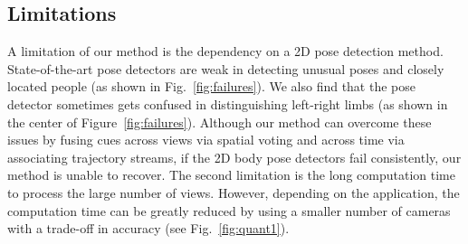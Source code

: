\subsection{Limitations}
\label{subsection:Limitation}
A limitation of our method is the dependency on a 2D pose detection method. State-of-the-art pose detectors are weak in detecting unusual poses and closely located people (as shown in  Fig.~\ref{fig:failures}). We also find that the pose detector sometimes gets confused in distinguishing left-right limbs (as shown in the center of Figure~\ref{fig:failures}). Although our method can overcome these issues by fusing cues across views via spatial voting and across time via associating trajectory streams, if the 2D body pose detectors fail consistently, our method is unable to recover. The second limitation is the long computation time to process the large number of views. However, depending on the application, the computation time can be greatly reduced by using a smaller number of cameras with a trade-off in accuracy (see Fig.~\ref{fig:quant1}). 
%
%

\clearpage




